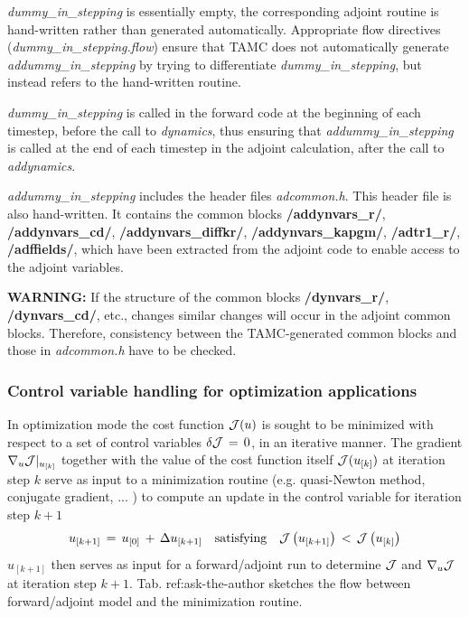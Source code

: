 \begin{itemize}
{\it dummy\_in\_stepping} is essentially empty,
the corresponding adjoint routine is hand-written rather
than generated automatically.
Appropriate flow directives ({\it dummy\_in\_stepping.flow})
ensure that TAMC does not automatically 
generate {\it addummy\_in\_stepping} by trying to differentiate
{\it dummy\_in\_stepping}, but instead refers to 
the hand-written routine.

{\it dummy\_in\_stepping} is called in the forward code
at the beginning of each
timestep, before the call to {\it dynamics}, thus ensuring
that {\it addummy\_in\_stepping} is called at the end of
each timestep in the adjoint calculation, after the call to
{\it addynamics}.

{\it addummy\_in\_stepping} includes the header files
{\it adcommon.h}.
This header file is also hand-written. It contains
the common blocks 
{\bf /addynvars\_r/}, {\bf /addynvars\_cd/},
{\bf /addynvars\_diffkr/}, {\bf /addynvars\_kapgm/},
{\bf /adtr1\_r/}, {\bf /adffields/},
which have been extracted from the adjoint code to enable
access to the adjoint variables.

{\bf WARNING:} If the structure of the common blocks
{\bf /dynvars\_r/}, {\bf /dynvars\_cd/}, etc., changes
similar changes will occur in the adjoint common blocks.
Therefore, consistency between the TAMC-generated common blocks
and those in {\it adcommon.h} have to be checked.
%
\end{itemize}


\subsubsection{Control variable handling for 
optimization applications}

In optimization mode the cost function $ {\cal J}(u) $ is sought
to be minimized with respect to a set of control variables
$ \delta {\cal J} \, = \, 0 $, in an iterative manner.
The gradient $ \nabla _{u}{\cal J} |_{u_{[k]}} $ together
with the value of the cost function itself $ {\cal J}(u_{[k]}) $ 
at iteration step $ k $ serve
as input to a minimization routine (e.g. quasi-Newton method,
conjugate gradient, ... \cite{gil-lem:89}) 
to compute an update in the
control variable for iteration step $k+1$
\[
u_{[k+1]} \, = \,  u_{[0]} \, + \, \Delta u_{[k+1]}
\quad \mbox{satisfying} \quad
 {\cal J} \left( u_{[k+1]} \right) \, < \, {\cal J} \left( u_{[k]} \right)
\]
$ u_{[k+1]} $ then serves as input for a forward/adjoint run
to determine $ {\cal J} $ and $ \nabla _{u}{\cal J} $ at iteration step
$ k+1 $.
Tab. ref:ask-the-author sketches the flow between forward/adjoint model
and the minimization routine.

